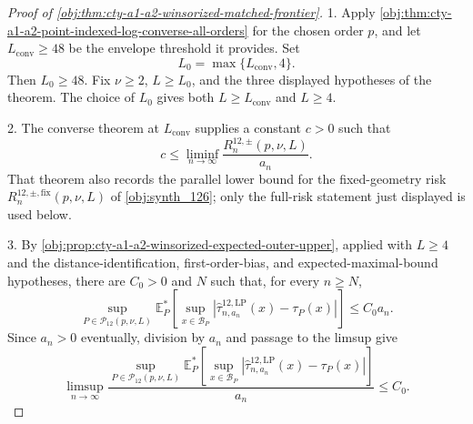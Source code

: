 \begin{proof}[Proof of \cref{obj:thm:cty-a1-a2-winsorized-matched-frontier}]
1. Apply \cref{obj:thm:cty-a1-a2-point-indexed-log-converse-all-orders} for the chosen order \(p\), and let \(L_{\mathrm{conv}}\ge 48\) be the envelope threshold it provides.  Set
\[
L_0=\max\{L_{\mathrm{conv}},4\}.
\]
Then \(L_0\ge 48\).  Fix \(\nu\ge 2\), \(L\ge L_0\), and the three displayed hypotheses of the theorem.  The choice of \(L_0\) gives both \(L\ge L_{\mathrm{conv}}\) and \(L\ge 4\).

2. The converse theorem at \(L_{\mathrm{conv}}\) supplies a constant \(c>0\) such that
\[
c
\le
\liminf_{n\to\infty}
\frac{R^{12,\pm}_n(p,\nu,L)}{a_n}.
\]
That theorem also records the parallel lower bound for the fixed-geometry risk \(R^{12,\pm,\mathrm{fix}}_n(p,\nu,L)\) of \cref{obj:synth_126}; only the full-risk statement just displayed is used below.

3. By \cref{obj:prop:cty-a1-a2-winsorized-expected-outer-upper}, applied with \(L\ge 4\) and the distance-identification, first-order-bias, and expected-maximal-bound hypotheses, there are \(C_0>0\) and \(N\) such that, for every \(n\ge N\),
\[
\sup_{P\in\mathcal P_{12}(p,\nu,L)}
\mathbb E_P^*\!\left[
\sup_{x\in\mathcal B_P}
\left|\widehat\tau^{12,\mathrm{LP}}_{n,a_n}(x)-\tau_P(x)\right|
\right]
\le C_0 a_n .
\]
Since \(a_n>0\) eventually, division by \(a_n\) and passage to the limsup give
\[
\limsup_{n\to\infty}
\frac{
\sup_{P\in\mathcal P_{12}(p,\nu,L)}
\mathbb E_P^*\!\left[
\sup_{x\in\mathcal B_P}
\left|\widehat\tau^{12,\mathrm{LP}}_{n,a_n}(x)-\tau_P(x)\right|
\right]}
{a_n}
\le C_0 .
\]


\end{proof}
